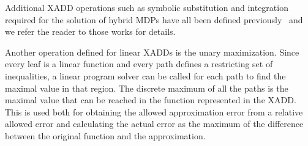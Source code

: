 Additional XADD operations such as symbolic substitution and
integration required for the solution of hybrid MDPs have all been
defined previously~\cite{sanner_uai11,zamani12} and we refer the
reader to those works for details.

Another operation defined for linear XADDs is the unary maximization. Since every leaf is a linear function and every path defines a restricting set of inequalities, a linear program solver can be called for each path to find the maximal value in that region. The discrete maximum of all the paths is the maximal value that can be reached in the function represented in the XADD. This is used both for obtaining the allowed approximation error from a relative allowed error and calculating the actual error as the maximum of the difference between the original function and the approximation.
